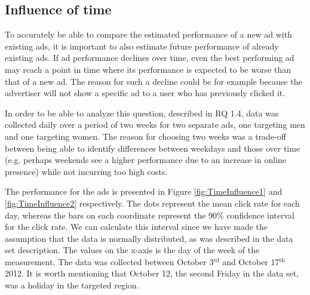 \documentclass{sig-alternate}
\newcommand{\superscript}[1]{\ensuremath{^{\textrm{#1}}}}
\begin{document}
\subsection{Influence of time}
To accurately be able to compare the estimated performance of a new ad with existing ads, it is important to also estimate future performance of already existing ads. If ad performance declines over time, even the best performing ad may reach a point in time where its performance is expected to be worse than that of a new ad. The reason for such a decline could be for example because the advertiser will not show a specific ad to a user who has previously clicked it.

In order to be able to analyze this question, described in RQ 1.4, data was collected daily over a period of two weeks for two separate ads, one targeting men and one targeting women. The reason for choosing two weeks was a trade-off between being able to identify differences between weekdays and those over time (e.g. perhaps weekends see a higher performance due to an increase in online presence) while not incurring too high costs.

The performance for the ads is presented in Figure \ref{fig:TimeInfluence1} and \ref{fig:TimeInfluence2} respectively. The dots represent the mean click rate for each day, whereas the bars on each coordinate represent the 90\% confidence interval for the click rate. We can calculate this interval since we have made the assumption that the data is normally distributed, as was described in the data set description. The values on the x-axis is the day of the week of the measurement. The data was collected between October 3\superscript{rd} and October 17\superscript{th} 2012. It is worth mentioning that October 12, the second Friday in the data set, was a holiday in the targeted region.
\end{document}
